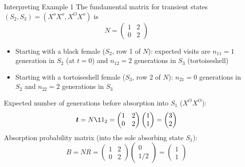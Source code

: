 \documentclass[aspectratio=169]{beamer}\usepackage[]{graphicx}\usepackage[]{xcolor}
\providecommand{\bt}{\bm{t}}
\begin{document}
\begin{frame}{Interpreting Example 1}
The fundamental matrix for transient states $(S_2, S_3) = (X^o X^o, X^O X^o)$ is
\[
N = \begin{pmatrix} 1 & 2 \\ 0 & 2 \end{pmatrix}
\]
\begin{itemize}
\item Starting with a black female ($S_2$, row 1 of $N$): expected visits are $n_{11} = 1$ generation in $S_2$ (at $t=0$) and $n_{12} = 2$ generations in $S_3$ (tortoiseshell)
\item Starting with a tortoiseshell female ($S_3$, row 2 of $N$): $n_{21} = 0$ generations in $S_2$ and $n_{22} = 2$ generations in $S_3$
\end{itemize}
\vfill
Expected number of generations before absorption into $S_1$ ($X^O X^O$):
\[
\bt = N\11_2 = \begin{pmatrix} 1 & 2 \\ 0 & 2 \end{pmatrix} \begin{pmatrix} 1 \\ 1 \end{pmatrix} = \begin{pmatrix} 3 \\ 2 \end{pmatrix}
\]
\vfill
Absorption probability matrix (into the sole absorbing state $S_1$):
\[
B = N R = \begin{pmatrix} 1 & 2 \\ 0 & 2 \end{pmatrix} \begin{pmatrix} 0 \\ 1/2 \end{pmatrix} = \begin{pmatrix} 1 \\ 1 \end{pmatrix}
\]
\end{frame}
\end{document}

